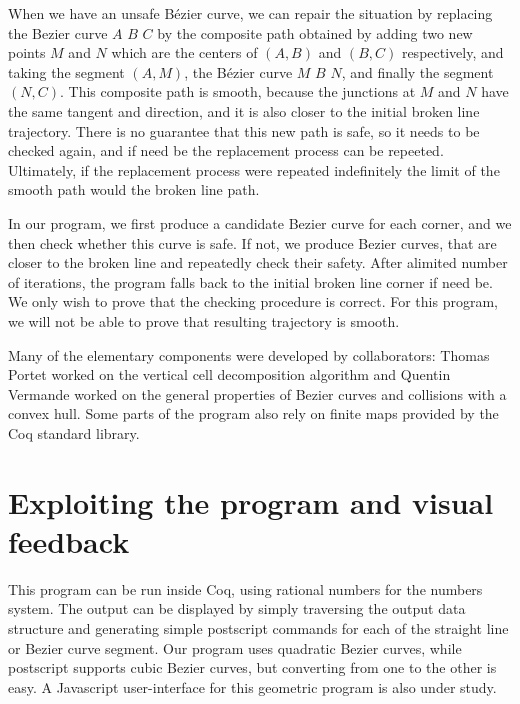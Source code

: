 \documentclass{easychair}
\begin{document}
When we have an unsafe Bézier curve, we can repair the situation by
replacing the Bezier curve \(A\) \(B\) \(C\) by the composite path
obtained by adding two new points \(M\) and \(N\) which are the
centers of \((A,B)\) and \((B,C)\) respectively, and taking the
segment \((A,M)\), the Bézier curve \(M\) \(B\) \(N\), and finally the
segment \((N, C)\).  This composite path is smooth, because the
junctions at \(M\) and \(N\) have the same tangent and direction, and
it is also closer to the initial broken line trajectory.  There is no
guarantee that this new path is safe, so it needs to be checked again,
and if need be the replacement process can be repeeted.  Ultimately,
if the replacement process were repeated indefinitely the limit of the
smooth path would the broken line path.

In our program, we first produce a candidate Bezier curve for each
corner, and we then check whether this curve is safe.  If not, we
produce Bezier curves, that are closer to the broken line and
repeatedly check their safety.  After alimited number of iterations,
the program falls back to the initial broken line corner if need be.
We only wish to prove that the checking procedure is correct.  For
this program, we will not be able to prove that resulting trajectory
is smooth.

Many of the elementary components were developed by collaborators:
Thomas Portet worked on the vertical cell decomposition algorithm and
Quentin Vermande worked on the general properties of Bezier curves and
collisions with a convex hull.  Some parts of the program also rely on
finite maps provided by the Coq standard library.

\section{Exploiting the program and visual feedback}
This program can be run inside Coq, using rational numbers for the numbers system.
The output can be displayed by simply traversing the output data structure and generating
simple postscript commands for each of the straight line or Bezier curve segment.  Our
program uses quadratic Bezier curves, while postscript supports cubic Bezier curves, but
converting from one to the other is easy.  A Javascript user-interface for this geometric
program is also under study.
\end{document}
